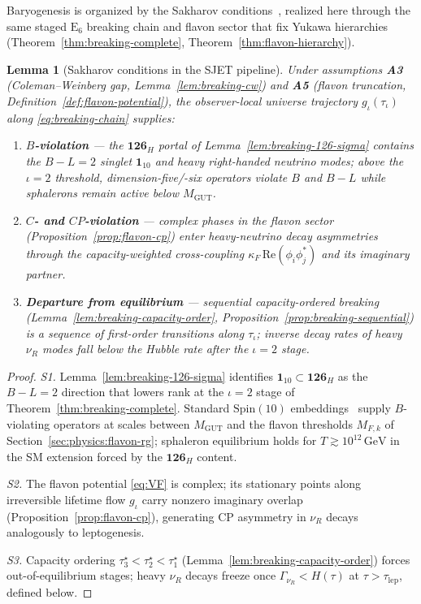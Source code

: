 \documentclass[aps,prd,onecolumn,amsmath,amssymb,nofootinbib,11pt]{revtex4-2}
\numberwithin{equation}{section}
\theoremstyle{plain}
\newtheorem{lemma}[theorem]{Lemma}
\theoremstyle{definition}
\theoremstyle{remark}
\newcommand{\E}[1]{\mathrm{E}_{#1}}
\newcommand{\Spin}{\mathrm{Spin}}
\begin{document}
Baryogenesis is organized by the Sakharov conditions~\cite{Sakharov1967},
realized here through the same staged $\E{6}$ breaking chain and flavon sector
that fix Yukawa hierarchies (Theorem~\ref{thm:breaking-complete},
Theorem~\ref{thm:flavon-hierarchy}).

\begin{lemma}[Sakharov conditions in the SJET pipeline]
\label{lem:sakharov-conditions}
Under assumptions \textbf{A3} (Coleman--Weinberg gap,
Lemma~\ref{lem:breaking-cw}) and \textbf{A5} (flavon truncation,
Definition~\ref{def:flavon-potential}), the observer-local universe
trajectory $g_\iota(\tau_\iota)$ along \eqref{eq:breaking-chain} supplies:
\begin{enumerate}[label=\textbf{S\arabic* :},leftmargin=*]
  \item \label{sak:b} \textbf{$B$-violation} --- the $\mathbf{126}_H$ portal of
    Lemma~\ref{lem:breaking-126-sigma} contains the $B\!-\!L=2$ singlet
    $\mathbf{1}_{10}$ and heavy right-handed neutrino modes; above the
    $\iota=2$ threshold, dimension-five/-six operators violate $B$ and
    $B\!-\!L$ while sphalerons remain active below $M_{\mathrm{GUT}}$.
  \item \label{sak:cp} \textbf{$C$- and $CP$-violation} --- complex phases in
    the flavon sector (Proposition~\ref{prop:flavon-cp}) enter heavy-neutrino
    decay asymmetries through the capacity-weighted cross-coupling
    $\kappa_F\,\mathrm{Re}(\phi_i\phi_j^*)$ and its imaginary partner.
  \item \label{sak:neq} \textbf{Departure from equilibrium} --- sequential
    capacity-ordered breaking
    (Lemma~\ref{lem:breaking-capacity-order},
    Proposition~\ref{prop:breaking-sequential}) is a sequence of first-order
    transitions along $\tau_\iota$; inverse decay rates of heavy $\nu_R$ modes
    fall below the Hubble rate after the $\iota=2$ stage.
\end{enumerate}
\end{lemma}

\begin{proof}
\emph{S1.} Lemma~\ref{lem:breaking-126-sigma} identifies
$\mathbf{1}_{10}\subset\mathbf{126}_H$ as the $B\!-\!L=2$ direction that
lowers rank at the $\iota=2$ stage of Theorem~\ref{thm:breaking-complete}.
Standard $\Spin(10)$ embeddings~\cite{Witten1985,GeorgiGlashow1974} supply
$B$-violating operators at scales between $M_{\mathrm{GUT}}$ and the flavon
thresholds $M_{F,k}$ of Section~\ref{sec:physics:flavon-rg}; sphaleron
equilibrium holds for $T\gtrsim 10^{12}\,\mathrm{GeV}$ in the SM extension
forced by the $\mathbf{126}_H$ content.

\emph{S2.} The flavon potential \eqref{eq:VF} is complex; its stationary
points along irreversible lifetime flow $g_\iota$ carry nonzero imaginary
overlap (Proposition~\ref{prop:flavon-cp}), generating CP asymmetry in
$\nu_R$ decays analogously to leptogenesis.

\emph{S3.} Capacity ordering $\tau_3^\star<\tau_2^\star<\tau_1^\star$
(Lemma~\ref{lem:breaking-capacity-order}) forces out-of-equilibrium stages;
heavy $\nu_R$ decays freeze once $\Gamma_{\nu_R}<H(\tau)$ at
$\tau>\tau_{\mathrm{lep}}$, defined below.
\end{proof}
\end{document}

